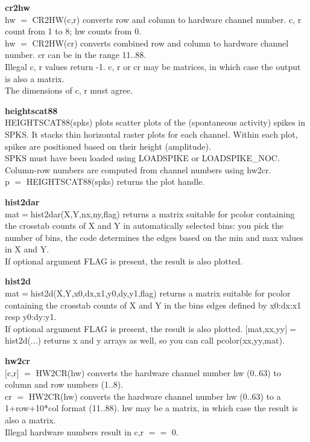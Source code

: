 \item {\bf cr2hw}\\
hw {$=$} CR2HW(c,r) converts row and column to hardware channel number.
c, r count from 1 to 8; hw counts from 0.
\\
hw {$=$} CR2HW(cr) converts combined row and column to hardware channel
number. cr can be in the range 11..88.
\\
Illegal c, r values return -1.
c, r or cr may be matrices, in which case the output is also a matrix.
\\
The dimensions of c, r must agree.

\item {\bf heightscat88}\\
HEIGHTSCAT88(spks) plots scatter plots of the (spontaneous activity) spikes
in SPKS. It stacks thin horizontal raster plots for each channel. Within
each plot, spikes are positioned based on their height (amplitude).
\\
SPKS must have been loaded using LOADSPIKE or LOADSPIKE\_NOC.
\\
Column-row numbers are computed from channel numbers using hw2cr.
\\
p {$=$} HEIGHTSCAT88(spks) returns the plot handle.

\item {\bf hist2dar}\\
mat{$=$}hist2dar(X,Y,nx,ny,flag) returns a matrix suitable for 
pcolor containing the crosstab counts of X and Y in automatically
selected bins: you pick the number of bins, the code determines the
edges based on the min and max values in X and Y.
\\
If optional argument FLAG is present, the result is also plotted.

\item {\bf hist2d}\\
mat{$=$}hist2d(X,Y,x0,dx,x1,y0,dy,y1,flag) returns a matrix suitable for 
pcolor containing the crosstab counts of X and Y in the bins edges defined by
x0:dx:x1 resp y0:dy:y1.
\\
If optional argument FLAG is present, the result is also plotted.
{$[$}mat,xx,yy{$]$}{$=$}hist2d(...) returns x and y arrays as well, so you can
call pcolor(xx,yy,mat).

\item {\bf hw2cr}\\
{$[$}c,r{$]$} {$=$} HW2CR(hw) converts the hardware channel number hw (0..63) to
column and row numbers (1..8).
\\
cr {$=$} HW2CR(hw) converts the hardware channel number hw (0..63) to
a 1+row+10*col format (11..88).
hw may be a matrix, in which case the result is also a matrix.
\\
Illegal hardware numbers result in c,r {$=$}{$=$} 0.

